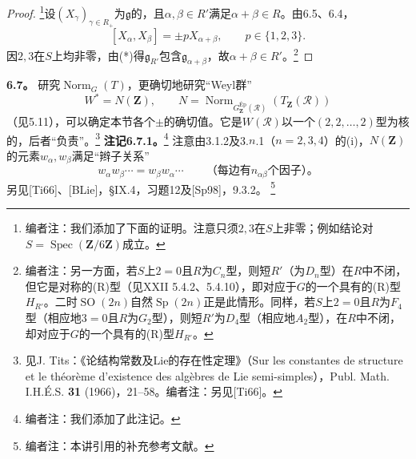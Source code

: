 \begin{proof}
\footnote{编者注：我们添加了下面的证明。注意只须$2,3$在$S$上非零；例如结论对$S=\operatorname{Spec}(\mathbf Z/6\mathbf Z)$成立。}设$(X_\gamma)_{\gamma\in R_+}$为$\mathfrak g$的，且$\alpha,\beta\in R'$满足$\alpha+\beta\in R$。由6.5、6.4，
\[[X_\alpha,X_\beta]=\pm pX_{\alpha+\beta},\qquad p\in\{1,2,3\}.\]
因$2,3$在$S$上均非零，由(*)得$\mathfrak g_{R'}$包含$\mathfrak g_{\alpha+\beta}$，故$\alpha+\beta\in R'$。\footnote{编者注：另一方面，若$S$上$2=0$且$R$为$C_n$型，则短$R'$（为$D_n$型）在$R$中不闭，但它是对称的(R)型（见XXII 5.4.2、5.4.10），即对应于$G$的一个具有的(R)型$H_{R'}$。二时$\operatorname{SO}(2n)$自然$\operatorname{Sp}(2n)$正是此情形。同样，若$S$上$2=0$且$R$为$F_4$型（相应地$3=0$且$R$为$G_2$型），则短$R'$为$D_4$型（相应地$A_2$型），在$R$中不闭，却对应于$G$的一个具有的(R)型$H_{R'}$。}
\end{proof}
\textbf{6.7。} 研究$\operatorname{Norm}_G(T)$，更确切地研究“Weyl群”
\[W^*=N(\mathbf Z),\qquad N=\operatorname{Norm}_{G_{\mathbf Z}^{\mathrm{Ép}}(\mathcal R)}(T_{\mathbf Z}(\mathcal R))\]
（见5.11），可以确定本节各个$\pm$的确切值。它是$W(\mathcal R)$以一个$(2,2,\ldots,2)$型为核的，后者“负责”。\footnote{见J. Tits：《论结构常数及Lie的存在性定理》（Sur les constantes de structure et le théorème d'existence des algèbres de Lie semi-simples），Publ. Math. I.H.É.S. \textbf{31} (1966)，21--58。编者注：另见[Ti66]。}
\textbf{注记6.7.1。}\footnote{编者注：我们添加了此注记。} 注意由3.1.2及3.$n$.1（$n=2,3,4$）的(i)，$N(\mathbf Z)$的元素$w_\alpha,w_\beta$满足“辫子关系”
\[w_\alpha w_\beta\cdots=w_\beta w_\alpha\cdots\qquad\text{（每边有$n_{\alpha\beta}$个因子）。}\]
另见[Ti66]、[BLie]，\S IX.4，习题12及[Sp98]，9.3.2。
\footnote{编者注：本讲引用的补充参考文献。}
